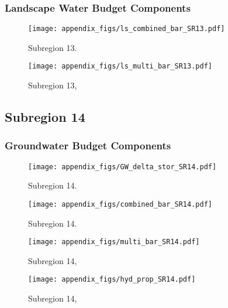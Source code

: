 \subsubsection{Landscape Water Budget Components}
\begin{figure}[ht]
\centerline{\texttt{[image: appendix\_figs/ls\_combined\_bar\_SR13.pdf]}}
\caption{\LSCombinedTextOne Subregion 13.\LSCombinedTextTwo}
\label{fig:LS_budget_SR13}
\end{figure}
\newpage

\begin{landscape}
\begin{figure}[ht]
\centerline{\texttt{[image: appendix\_figs/ls\_multi\_bar\_SR13.pdf]}}
\caption{\LSMultiTextOne Subregion 13,\LSMultiTextTwo}
\label{fig:multi_LS_budget_SR13}
\end{figure}
\newpage
\end{landscape}

\subsection{Subregion 14}
\subsubsection{Groundwater Budget Components}
\begin{figure}[h]
\centerline{\texttt{[image: appendix\_figs/GW\_delta\_stor\_SR14.pdf]}}
\caption{\GWBudgetText Subregion 14.}
\label{fig:delta_stor_SR14}
\end{figure}
\newpage

\begin{figure}[ht]
\centerline{\texttt{[image: appendix\_figs/combined\_bar\_SR14.pdf]}}
\caption{\GWCombinedTextOne Subregion 14.\GWCombinedTextTwo}
\label{fig:GW_budget_SR14}
\end{figure}
\newpage

\begin{landscape}
\begin{figure}[ht]
\centerline{\texttt{[image: appendix\_figs/multi\_bar\_SR14.pdf]}}
\caption{\GWMultiTextOne Subregion 14,\GWMultiTextTwo}
\label{fig:multi_GW_budget_SR14}
\end{figure}
\newpage

\begin{figure}[ht]
\centerline{\texttt{[image: appendix\_figs/hyd\_prop\_SR14.pdf]}}
\caption{\HydPropOne Subregion 14,\HydPropTwo}
\label{fig:hyd_prop_SR14}
\end{figure}
\newpage
\end{landscape}

